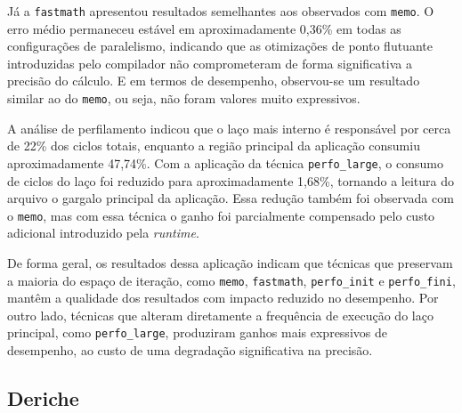 Já a \texttt{fastmath} apresentou resultados semelhantes aos observados com \texttt{memo}. O erro médio permaneceu estável em aproximadamente 0,36\% em todas as configurações de paralelismo, indicando que as otimizações de ponto flutuante introduzidas pelo compilador não comprometeram de forma significativa a precisão do cálculo. E em termos de desempenho, observou-se um resultado similar ao do \texttt{memo}, ou seja, não foram valores muito expressivos.

A análise de perfilamento indicou que o laço mais interno é responsável por cerca de 22\% dos ciclos totais, enquanto a região principal da aplicação consumiu aproximadamente 47,74\%. Com a aplicação da técnica \texttt{perfo\_large}, o consumo de ciclos do laço foi reduzido para aproximadamente 1,68\%, tornando a leitura do arquivo o gargalo principal da aplicação. Essa redução também foi observada com o \texttt{memo}, mas com essa técnica o ganho foi parcialmente compensado pelo custo adicional introduzido pela \textit{runtime}.

De forma geral, os resultados dessa aplicação indicam que técnicas que preservam a maioria do espaço de iteração, como \texttt{memo}, \texttt{fastmath}, \texttt{perfo\_init} e \texttt{perfo\_fini}, mantêm a qualidade dos resultados com impacto reduzido no desempenho. Por outro lado, técnicas que alteram diretamente a frequência de execução do laço principal, como \texttt{perfo\_large}, produziram ganhos mais expressivos de desempenho, ao custo de uma degradação significativa na precisão.

\subsection{Deriche}\label{subsec:deriche_resultados}

